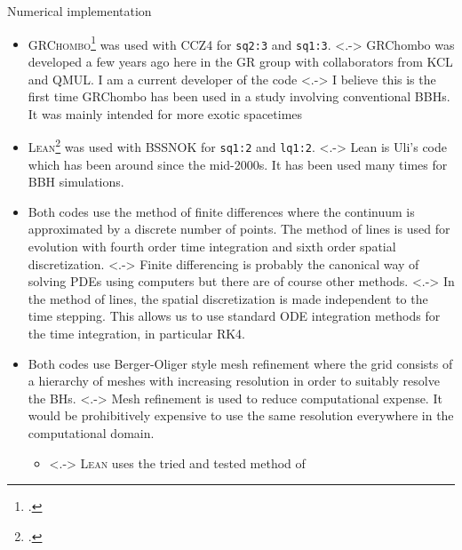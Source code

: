 \documentclass[smaller,aspectratio=169]{beamer}
\begin{document}
\begin{frame}{Numerical implementation}
    \small
    \begin{itemize}
        \item<+->
            \textsc{GRChombo}\footcite{Clough:2015sqa} was used with 
            \alert{CCZ4} for \texttt{sq2:3} and \texttt{sq1:3}.
        \note[item]<.->{\scriptsize
            GRChombo was developed a few years ago here in the GR group with 
            collaborators from KCL and QMUL. I am a current developer of the 
            code}
        \note[item]<.->{\scriptsize
            I believe this is the first time GRChombo has been used in a study
            involving conventional BBHs. It was mainly intended for more exotic
            spacetimes}
        \item<+->
            \textsc{Lean}\footcite{Sperhake:2006cy} was used with 
            \alert{BSSNOK} for \texttt{sq1:2} and \texttt{lq1:2}.
        \note[item]<.->{\scriptsize
            Lean is Uli's code which has been around since the mid-2000s. It has
            been used many times for BBH simulations.}
        \item<+->
            Both codes use the method of \alert{finite differences} where the
            continuum is approximated by a discrete number of points.
            The \alert{method of lines} is used for evolution with fourth order 
            time integration and sixth order spatial discretization.
        \note[item]<.->{\scriptsize
            Finite differencing is probably the canonical way of solving
            PDEs using computers but there are of course other methods.}
        \note[item]<.->{\scriptsize
            In the method of lines, the spatial discretization is made
            independent to the time stepping. This allows us to use standard
            ODE integration methods for the time integration, in particular 
            RK4.}
        \item<+->
            Both codes use Berger-Oliger style \alert{mesh refinement} where 
            the grid consists of a hierarchy of meshes with increasing 
            resolution in order to suitably resolve the BHs.
        \note[item]<.->{\scriptsize
            Mesh refinement is used to reduce computational expense. It would be
            prohibitively expensive to use the same resolution everywhere
            in the computational domain.}
        \begin{itemize}
            \item<.-> 
                \textsc{Lean} uses the tried and tested method of 

\end{itemize}
\end{itemize}
\end{frame}
\end{document}
